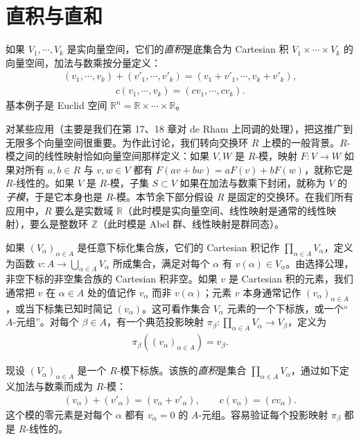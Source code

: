 \documentclass[../../main.tex]{subfiles}
\begin{document}
\section{直积与直和}\label{section:appB-direct-products-and-sums}

如果 $V_1,\cdots ,V_k$ 是实向量空间，它们的\emph{直积}是底集合为 Cartesian 积 $V_1\times\cdots\times V_k$ 的向量空间，加法与数乘按分量定义：
\begin{align*}
(v_1,\cdots ,v_k)+(v'_1,\cdots ,v'_k)=(v_1+v'_1,\cdots ,v_k+v'_k),
\end{align*}
\begin{align*}
c(v_1,\cdots ,v_k)=(cv_1,\cdots ,cv_k).
\end{align*}
基本例子是 Euclid 空间 $\mathbb R^n=\mathbb R\times\cdots\times\mathbb R$。

对某些应用（主要是我们在第 17、18 章对 de Rham 上同调的处理），把这推广到无限多个向量空间很重要。为作此讨论，我们转向交换环 $R$ 上模的一般背景。$R$-模之间的线性映射恰如向量空间那样定义：如果 $V,W$ 是 $R$-模，映射 $F:V\to W$ 如果对所有 $a,b\in R$ 与 $v,w\in V$ 都有 $F(av+bw)=aF(v)+bF(w)$，就称它是 $R$-线性的。如果 $V$ 是 $R$-模，子集 $S\subset V$ 如果在加法与数乘下封闭，就称为 $V$ 的\emph{子模}，于是它本身也是 $R$-模。本节余下部分假设 $R$ 是固定的交换环。在我们所有应用中，$R$ 要么是实数域 $\mathbb R$（此时模是实向量空间、线性映射是通常的线性映射），要么是整数环 $\mathbb Z$（此时模是 Abel 群、线性映射是群同态）。

如果 $(V_\alpha)_{\alpha\in A}$ 是任意下标化集合族，它们的 Cartesian 积记作 $\prod_{\alpha\in A}V_\alpha$，定义为函数 $v:A\to\bigcup_{\alpha\in A}V_\alpha$ 所成集合，满足对每个 $\alpha$ 有 $v(\alpha)\in V_\alpha$。由选择公理，非空下标的非空集合族的 Cartesian 积非空。如果 $v$ 是 Cartesian 积的元素，我们通常把 $v$ 在 $\alpha\in A$ 处的值记作 $v_\alpha$ 而非 $v(\alpha)$；元素 $v$ 本身通常记作 $(v_\alpha)_{\alpha\in A}$，或当下标集已知时简记 $(v_\alpha)$。这可看作集合 $V_\alpha$ 元素的一个下标族，或一个“$A$-元组”。对每个 $\beta\in A$，有一个典范投影映射 $\pi_\beta:\prod_{\alpha\in A}V_\alpha\to V_\beta$，定义为
\begin{align*}
\pi_\beta((v_\alpha)_{\alpha\in A})=v_\beta.
\end{align*}

现设 $(V_\alpha)_{\alpha\in A}$ 是一个 $R$-模下标族。该族的\emph{直积}是集合 $\prod_{\alpha\in A}V_\alpha$，通过如下定义加法与数乘而成为 $R$-模：
\begin{align*}
(v_\alpha)+(v'_\alpha)=(v_\alpha+v'_\alpha),\qquad c(v_\alpha)=(cv_\alpha).
\end{align*}
这个模的零元素是对每个 $\alpha$ 都有 $v_\alpha=0$ 的 $A$-元组。容易验证每个投影映射 $\pi_\beta$ 都是 $R$-线性的。
\end{document}

